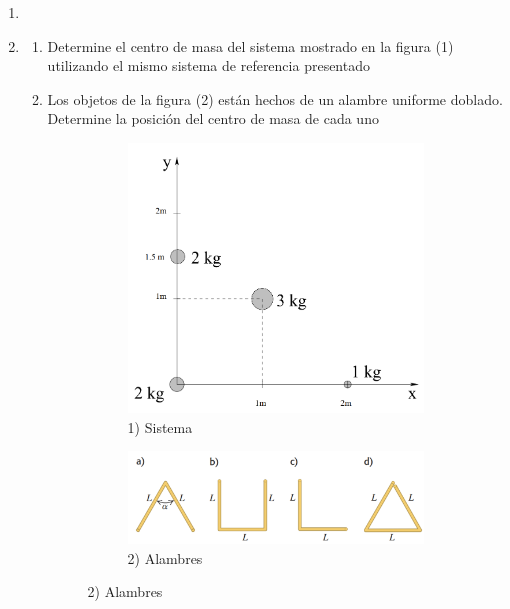 \documentclass[letterpaper,11pt]{article}
\begin{document}
\vspace{-1cm}
\begin{enumerate}\setlength{\itemsep}{0.4cm}

\item[]

\item
\begin{enumerate}
    \item Determine el centro de masa del sistema mostrado en la figura (1) utilizando el mismo sistema de referencia presentado
    
    \item Los objetos de la figura (2) están hechos de un alambre uniforme doblado. Determine la posición del centro de masa de cada uno

    \begin{figure}[H]
        \centering
        \begin{subfigure}[t]{0.25\textwidth}
            \includegraphics[width=1\linewidth]{2023-1/img/aux_12/axis.png}
            \caption*{1) Sistema}
        \end{subfigure}
        \hspace{3em}
        \begin{subfigure}[t]{0.6\textwidth}
            \includegraphics[width=1\linewidth]{2023-1/img/aux_12/alambres.png}
            \caption*{2) Alambres}
        \end{subfigure}
    \end{figure}
\end{enumerate}


\end{enumerate}
\end{document}
